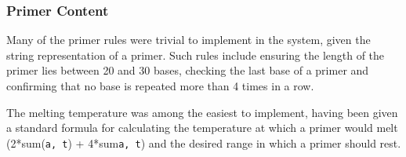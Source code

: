 \subsubsection{Primer Content}
Many of the primer rules were trivial to implement in the system, given
the string representation of a primer. Such rules include ensuring the
length of the primer lies between 20 and 30 bases, checking the last base
of a primer and confirming that no base is repeated more than 4 times
in a row. 

The melting temperature was among the easiest to implement, having been
given a standard formula for calculating the temperature at which a primer
would melt (2*sum(\verb£a, t£) + 4*sum\verb£a, t£) and the desired range
in which a primer should rest.


